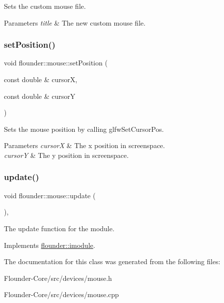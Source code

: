 Sets the custom mouse file. 


\begin{DoxyParams}{Parameters}
{\em title} & The new custom mouse file. \\
\hline
\end{DoxyParams}
\mbox{\label{classflounder_1_1mouse_a47fae906e36e62f4cfd5939b37a0476c}} 
\subsubsection{\texorpdfstring{set\+Position()}{setPosition()}}
{\footnotesize\ttfamily void flounder\+::mouse\+::set\+Position (\begin{DoxyParamCaption}\item[{const double \&}]{cursorX,  }\item[{const double \&}]{cursorY }\end{DoxyParamCaption})}



Sets the mouse position by calling glfw\+Set\+Cursor\+Pos. 


\begin{DoxyParams}{Parameters}
{\em cursorX} & The x position in screenspace. \\
\hline
{\em cursorY} & The y position in screenspace. \\
\hline
\end{DoxyParams}
\mbox{\label{classflounder_1_1mouse_aa1b1d60e1d1cf4ec7d19eaef65e040bc}} 
\subsubsection{\texorpdfstring{update()}{update()}}
{\footnotesize\ttfamily void flounder\+::mouse\+::update (\begin{DoxyParamCaption}{ }\end{DoxyParamCaption})\hspace{0.3cm}{\ttfamily [override]}, {\ttfamily [virtual]}}



The update function for the module. 



Implements \hyperlink{classflounder_1_1imodule_a9a53d48a46b5f6b16a92b2cd8503f74a}{flounder\+::imodule}.



The documentation for this class was generated from the following files\+:\begin{DoxyCompactItemize}
\item 
Flounder-\/\+Core/src/devices/mouse.\+h\item 
Flounder-\/\+Core/src/devices/mouse.\+cpp\end{DoxyCompactItemize}
